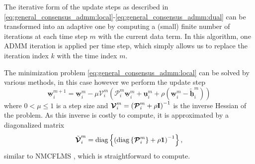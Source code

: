 \documentclass{article}
\newcommand{\uu}{\mtxb{u}}
\newcommand{\hf}{\underline{\bm{h}}}
\newcommand{\wf}{\underline{\bm{w}}}
\newcommand{\uuf}{\underline{\bm{u}}}
\newcommand{\aRhof}{\bm{\mathcal{P}}}
\newcommand{\I}{\mtxb{I}}
\begin{document}
The iterative form of the update steps as described in \eqref{eq:general_consensus_admm:local}-\eqref{eq:general_consensus_admm:dual} can be transformed into an adaptive one by computing a (small) finite number of iterations at each time step \(m\) with the current data term.
In this algorithm, one ADMM iteration is applied per time step, which simply allows us to replace the iteration index \(k\) with the time index \(m\).

The minimization problem \eqref{eq:general_consensus_admm:local} can be solved by various methods, in this case however we perform the update step
\begin{equation}
    \wf_i^{m+1} = \wf_i^{m} - \mu \bm{\mathcal{V}}_i^m \left( \aRhof_i^m \wf_i^m + \uuf_i^m + \rho\left(\wf_i^m - \tilde{\hf}_i^{m}\right)\right)\label{eq:online_admm:local_update}
\end{equation}
where \(0  < \mu\leq 1\) is a step size and \(\bm{\mathcal{V}}_i^m = \left(\aRhof_i^m + \rho \I \right)^{-1}\) is the inverse Hessian of the problem.
As this inverse is costly to compute, it is approximated by a diagonalized matrix
\begin{equation}
    \tilde{\bm{\mathcal{V}}}_i^m = \operatorname{diag} \left\{ \left( \operatorname{diag} \left\{ \aRhof_i^m \right\} + \rho \mtxb{1} \right)^{-1}\right\},
\end{equation}
similar to NMCFLMS \cite{}, which is straightforward to compute.

\end{document}
